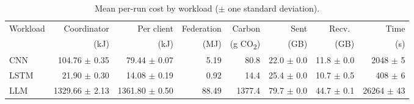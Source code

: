 \begin{table}[t]
\centering
\caption{Mean per-run cost by workload ($\pm$ one standard deviation).}
\label{tab:cost}
\footnotesize
\begin{tabular}{lrrrrrrr}
\toprule
Workload & Coordinator & Per client & Federation & Carbon & Sent & Recv.\ & Time \\
         & (kJ)        & (kJ)       & (MJ)       & (g CO\textsubscript{2}) & (GB) & (GB) & (s) \\
\midrule
CNN  & \num{104.76} $\pm$ \num{0.35} & \num{79.44} $\pm$ \num{0.07} & \num{5.19} & \num{80.8} & \num{22.0} $\pm$ \num{0.0} & \num{11.8} $\pm$ \num{0.0} & \num{2048} $\pm$ \num{5} \\
LSTM & \num{21.90} $\pm$ \num{0.30} & \num{14.08} $\pm$ \num{0.19} & \num{0.92} & \num{14.4} & \num{25.4} $\pm$ \num{0.0} & \num{10.7} $\pm$ \num{0.5} & \num{408} $\pm$ \num{6} \\
LLM  & \num{1329.66} $\pm$ \num{2.13} & \num{1361.80} $\pm$ \num{0.50} & \num{88.49} & \num{1377.4} & \num{79.7} $\pm$ \num{0.0} & \num{44.7} $\pm$ \num{0.1} & \num{26264} $\pm$ \num{43} \\
\bottomrule
\end{tabular}
\end{table}
